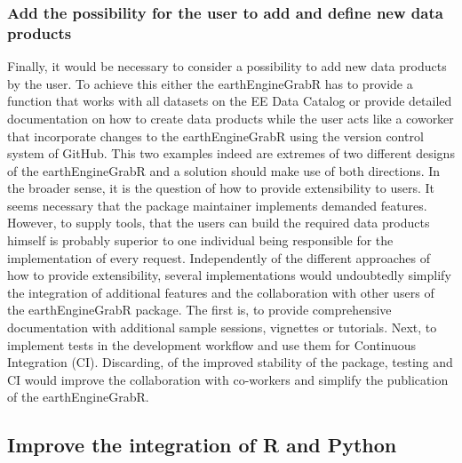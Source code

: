 \subsubsection{Add the possibility for the user to add and define new data products}

Finally, it would be necessary to consider a possibility to add new data products by the user. To achieve this either the earthEngineGrabR has to provide a function that works with all datasets on the EE Data Catalog or provide detailed documentation on how to create data products while the user acts like a coworker that incorporate changes to the earthEngineGrabR using the version control system of GitHub. This two examples indeed are extremes of two different designs of the earthEngineGrabR and a solution should make use of both directions. In the broader sense, it is the question of how to provide extensibility to users. It seems necessary that the package maintainer implements demanded features. However, to supply tools, that the users can build the required data products himself is probably superior to one individual being responsible for the implementation of every request.
Independently of the different approaches of how to provide extensibility, several implementations would undoubtedly simplify the integration of additional features and the collaboration with other users of the earthEngineGrabR package. The first is, to provide comprehensive documentation with additional sample sessions, vignettes or tutorials. Next, to implement tests in the development workflow and use them for Continuous Integration (CI). Discarding, of the improved stability of the package, testing and CI would improve the collaboration with co-workers and simplify the publication of the earthEngineGrabR. 

\subsection{Improve the integration of R and Python}


